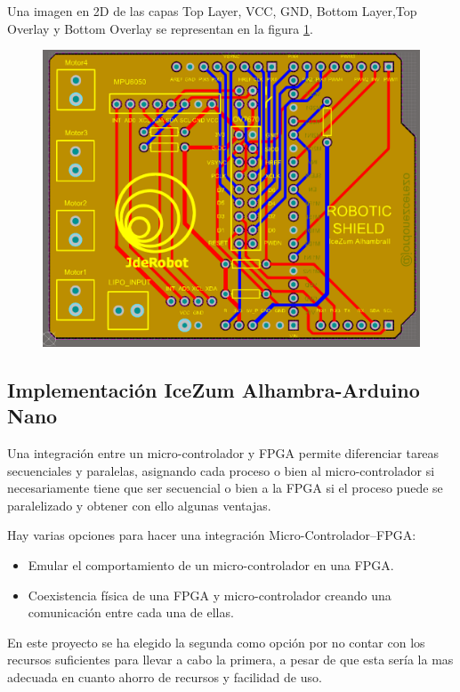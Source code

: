 Una imagen en 2D de las capas Top Layer, VCC, GND, Bottom Layer,Top Overlay y Bottom Overlay se representan en la figura \ref{fig:layers_altium}.


\begin{center}
	\begin{figure}[H]
		\center
		\includegraphics[scale=0.8, angle=90]{imagenes/Balancing_Robot/layers_altium.PNG}
		\caption{}
		\label{fig:layers_altium}
	\end{figure}
\end{center}


\subsection{Implementación IceZum Alhambra-Arduino Nano}\label{sec:Integracion}
Una integración entre un micro-controlador y FPGA permite diferenciar tareas secuenciales y paralelas, asignando cada proceso o bien al micro-controlador si necesariamente tiene que ser secuencial o bien a la FPGA si el proceso puede se paralelizado y obtener con ello algunas ventajas. \newline

Hay varias opciones para hacer una integración Micro-Controlador--FPGA:

\begin{itemize}
	\item Emular el comportamiento de un micro-controlador en una FPGA.
	\item Coexistencia física de una FPGA y micro-controlador creando una comunicación entre cada una de ellas.
\end{itemize}
En este proyecto se ha elegido la segunda como opción por no contar con los recursos suficientes para llevar a cabo la primera, a pesar de que esta sería la mas adecuada en cuanto ahorro de recursos y facilidad de uso. \newline

